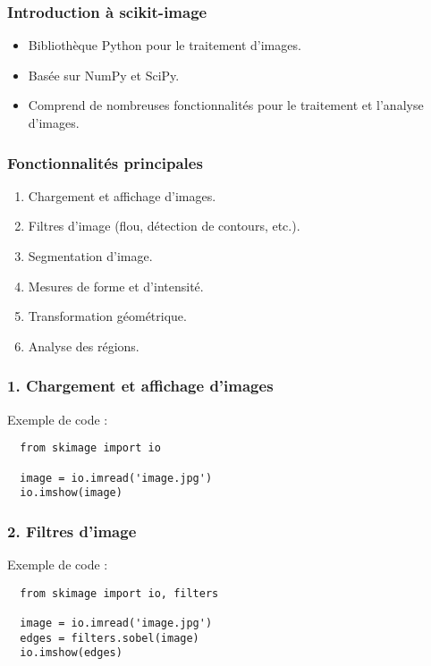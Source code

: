 \begin{frame}
    \frametitle{Introduction à scikit-image}
    \begin{itemize}
      \item Bibliothèque Python pour le traitement d'images.
      \item Basée sur NumPy et SciPy.
      \item Comprend de nombreuses fonctionnalités pour le traitement et l'analyse d'images.
    \end{itemize}
  \end{frame}
  
  \begin{frame}
    \frametitle{Fonctionnalités principales}
    \begin{enumerate}
      \item Chargement et affichage d'images.
      \item Filtres d'image (flou, détection de contours, etc.).
      \item Segmentation d'image.
      \item Mesures de forme et d'intensité.
      \item Transformation géométrique.
      \item Analyse des régions.
    \end{enumerate}
  \end{frame}
  
  \begin{frame}[fragile] %
    \frametitle{1. Chargement et affichage d'images}
    \begin{block}{Exemple de code :}
      \begin{verbatim}
  from skimage import io
  
  image = io.imread('image.jpg')
  io.imshow(image)
      \end{verbatim}
    \end{block}
  \end{frame}
  
  \begin{frame}[fragile]
    \frametitle{2. Filtres d'image}
    \begin{block}{Exemple de code :}
      \begin{verbatim}
  from skimage import io, filters
  
  image = io.imread('image.jpg')
  edges = filters.sobel(image)
  io.imshow(edges)
      \end{verbatim}
    \end{block}
  \end{frame}
  
